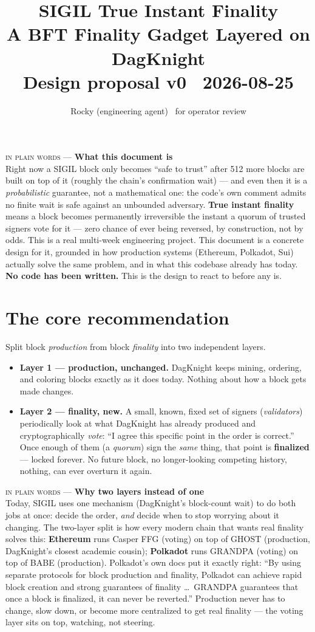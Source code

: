 \documentclass[10pt,a4paper]{article}
\title{\textcolor{ink}{\LARGE SIGIL True Instant Finality}\\[5pt]
\large A BFT Finality Gadget Layered on DagKnight\\[4pt]
\normalsize Design proposal v0 \textperiodcentered\ 2026-08-25}
\author{Rocky (engineering agent) \textperiodcentered\ for operator review}
\date{}
\newcommand{\layman}[3]{%
\begin{tcolorbox}[enhanced,
  interior style={left color=#1!9,right color=white},
  colframe=#1!45!slate,boxrule=0.5pt,arc=3pt,
  borderline west={2.5pt}{0pt}{#1},
  left=9pt,right=9pt,top=7pt,bottom=7pt]
{\scriptsize\textcolor{#1}{\textsc{in plain words}}\; — \;\textbf{\small #2}}\\[3pt]
\small #3
\end{tcolorbox}}
\begin{document}
\maketitle

\layman{sigilviolet}{What this document is}{%
Right now a SIGIL block only becomes ``safe to trust'' after 512 more blocks are built on top of it
(roughly the chain's confirmation wait) — and even then it is a \emph{probabilistic} guarantee, not a
mathematical one: the code's own comment admits no finite wait is safe against an unbounded adversary.
\textbf{True instant finality} means a block becomes permanently irreversible the instant a quorum of
trusted signers vote for it — zero chance of ever being reversed, by construction, not by odds. This is a
real multi-week engineering project. This document is a concrete design for it, grounded in how
production systems (Ethereum, Polkadot, Sui) actually solve the same problem, and in what this codebase
already has today. \textbf{No code has been written.} This is the design to react to before any is.}

\tableofcontents

\section{The core recommendation}

Split block \emph{production} from block \emph{finality} into two independent layers.

\begin{itemize}[leftmargin=1.4em]
  \item \textbf{Layer 1 — production, unchanged.} DagKnight keeps mining, ordering, and coloring blocks
  exactly as it does today. Nothing about how a block gets made changes.
  \item \textbf{Layer 2 — finality, new.} A small, known, fixed set of signers (\emph{validators})
  periodically look at what DagKnight has already produced and cryptographically \emph{vote}: ``I agree
  this specific point in the order is correct.'' Once enough of them (a \emph{quorum}) sign the
  \emph{same} thing, that point is \textbf{finalized} — locked forever. No future block, no
  longer-looking competing history, nothing, can ever overturn it again.
\end{itemize}

\layman{sigilcyan}{Why two layers instead of one}{%
Today, SIGIL uses one mechanism (DagKnight's block-count wait) to do both jobs at once: decide the
order, \emph{and} decide when to stop worrying about it changing. The two-layer split is how every
modern chain that wants real finality solves this: \textbf{Ethereum} runs Casper FFG (voting) on top of
GHOST (production, DagKnight's closest academic cousin); \textbf{Polkadot} runs GRANDPA (voting) on top
of BABE (production). Polkadot's own docs put it exactly right: ``By using separate protocols for block
production and finality, Polkadot can achieve rapid block creation and strong guarantees of
finality \dots\ GRANDPA guarantees that once a block is finalized, it can never be reverted.''
Production never has to change, slow down, or become more centralized to get real finality — the voting
layer sits on top, watching, not steering.}
\end{document}
